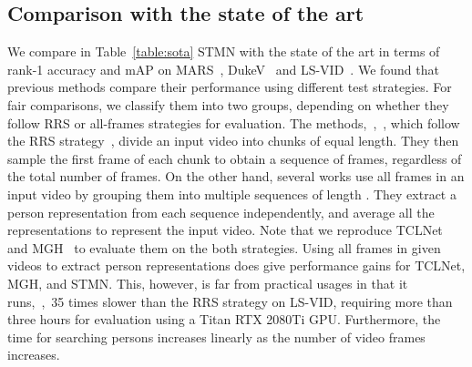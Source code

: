\documentclass[10pt,twocolumn,letterpaper]{article}
\begin{document}
			
	
		
		
	\subsection{Comparison with the state of the art} \label{subsec:comp_w_sota}
	\vspace{-0.1cm}
	
		We compare in Table~\ref{table:sota} STMN with the state of the art in terms of rank-1 accuracy and mAP on MARS~\cite{zheng2016mars}, DukeV~\cite{wu2018exploit} and LS-VID~\cite{li2019global}. We found that previous methods compare their performance using different test strategies. For fair comparisons, we classify them into two groups, depending on whether they follow RRS or all-frames strategies for evaluation. The methods,~\eg,~\cite{li2018diversity,liu2019spatially}, which follow the RRS strategy~\cite{li2018diversity}, divide an input video into  chunks of equal length. They then sample the first frame of each chunk to obtain a sequence of  frames, regardless of the total number of frames. On the other hand, several works use all frames in an input video by grouping them into multiple sequences of length . They extract a person representation from each sequence independently, and average all the representations to represent the input video. Note that we reproduce TCLNet~\cite{hou2020temporal} and  MGH~\cite{yan2020learning} to evaluate them on the both strategies. Using all frames in given videos to extract person representations does give performance gains for TCLNet, MGH, and STMN. This, however, is far from practical usages in that it runs,~\eg,~35 times slower than the RRS strategy on LS-VID, requiring more than three hours for evaluation using a Titan RTX 2080Ti GPU. Furthermore, the time for searching persons increases linearly as the number of video frames increases.
		
\end{document}
